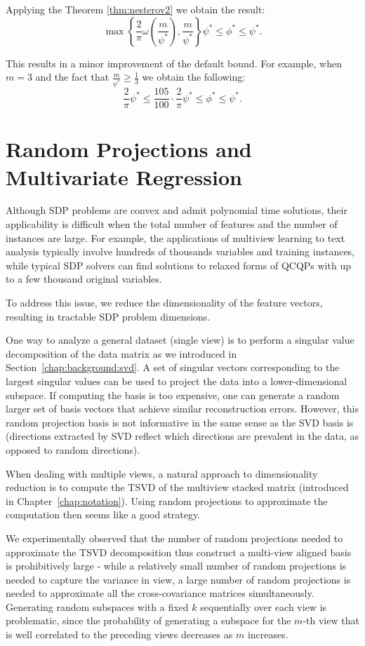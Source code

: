 Applying the Theorem \ref{thm:nesterov2} we obtain the result:
$$ \max\left\{\frac{2}{\pi}\omega\left(\frac{m}{\psi^*}\right), \frac{m}{\psi^*} \right\}   \psi^* \leq \phi^* \leq \psi^*.$$

This results in a minor improvement of the default bound. For example, when $m = 3$ and
the fact that $\frac{m}{\psi^*} \geq \frac{1}{3}$ we obtain the following:
$$ \frac{2}{\pi} \psi^* \leq \frac{105}{100}  \cdot \frac{2}{\pi} \psi^* \leq \phi^* \leq \psi^*.$$


\section{Random Projections and Multivariate Regression}\label{chap:relaxations:practical}

Although SDP problems are convex and admit polynomial time solutions, their
applicability is difficult when the total number of features and the number of
instances are large. For example, the applications of multiview
learning to text analysis typically involve hundreds of thousands variables
and training instances, while typical SDP solvers can find solutions to relaxed forms of
QCQPs with up to a few thousand original variables.

To address this issue, we reduce the dimensionality of the feature vectors, resulting in
tractable SDP problem dimensions.

One way to analyze a general dataset (single view) is to
perform a singular value decomposition of the data matrix as
we introduced in Section~\ref{chap:background:svd}.
A set of singular vectors corresponding to the largest singular
values can be used to project the data into a lower-dimensional
subspace. If computing the basis is too expensive, one can generate a random
larger set of basis vectors that achieve similar reconstruction
errors. However, this random projection basis is not
informative in the same sense as the SVD basis is
(directions extracted by SVD reflect which directions are
prevalent in the data, as opposed to random directions).

When dealing with multiple views, a natural approach to
dimensionality reduction is to compute the TSVD of the multiview stacked matrix (introduced in Chapter~\ref{chap:notation}).
Using random projections to approximate the computation then seems like
a good strategy.

We experimentally observed that the number of random projections needed to approximate
the TSVD decomposition thus construct a multi-view aligned basis is prohibitively large -
while a relatively small number of random projections is needed to capture the variance in view, a large
number of random projections is needed to approximate all the cross-covariance matrices simultaneously.
Generating random subspaces with a fixed $k$ sequentially over each view is problematic, since
the probability of generating a subspace for the $m$-th view that is well correlated to the preceding
views decreases as $m$ increases.

